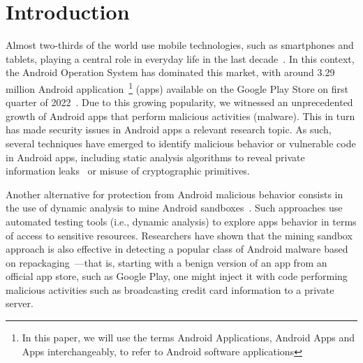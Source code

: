 \section{Introduction}\label{sec:introduction}

Almost two-thirds of the world use mobile technologies, such as smartphones and tablets, playing a central role in everyday life in the last decade~\cite{Comscore,DBLP:journals/tse/MartinSJZH17}. In this context, the Android Operation System has dominated this market, with around 3.29 million Android application~\footnote{In this paper, we will use the terms Android Applications, Android Apps and Apps interchangeably, to refer to Android software applications} (apps) available on the Google Play Store on first quarter of 2022~\cite{Statista}. Due to this growing popularity, we witnessed an unprecedented growth of  Android apps that perform malicious activities (malware).  This in turn has made security issues in Android apps a relevant research topic. As such, several techniques have emerged to identify malicious behavior or vulnerable code in Android apps, including static analysis algorithms to reveal private information leaks~\cite{DBLP:conf/pldi/ArztRFBBKTOM14} or misuse of 
cryptographic primitives.~\cite{DBLP:journals/tse/KrugerSABM21}

Another alternative for protection from Android malicious behavior consists in the use of dynamic analysis to mine Android sandboxes~\cite{DBLP:conf/icse/JamrozikSZ16}. Such approaches use automated testing tools (i.e., dynamic analysis) to explore apps behavior in terms of access to sensitive resources. Researchers have shown that the mining sandbox approach is also effective in detecting a popular class of Android malware based on repackaging~\cite{DBLP:conf/wcre/BaoLL18,le2018towards}---that is, starting with a benign version of an app from an official app store, such as Google Play, one might inject it with code performing malicious activities such as broadcasting credit card information to a private server.~\cite{DBLP:journals/tse/LiBK21} %

